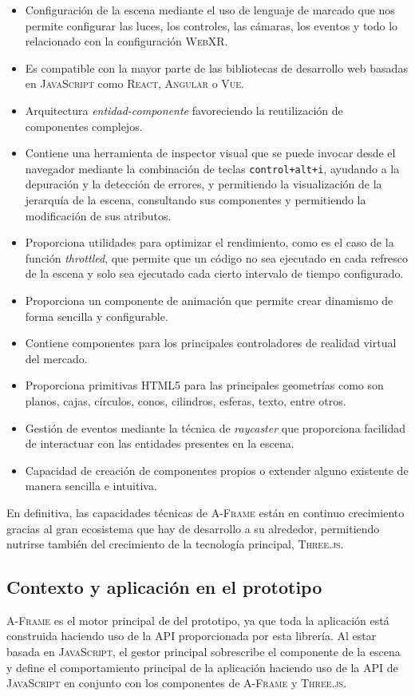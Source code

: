 \documentclass[a4paper, 11pt]{book}
\begin{document}
\begin{itemize}
	\item Configuración de la escena mediante el uso de lenguaje de marcado que nos permite configurar las luces, los controles, las cámaras, los eventos y todo lo relacionado con la configuración \textsc{WebXR}.
	\item Es compatible con la mayor parte de las bibliotecas de desarrollo web basadas en \textsc{JavaScript} como \textsc{React}, \textsc{Angular} o \textsc{Vue}.
	\item Arquitectura \emph{entidad-componente} favoreciendo la reutilización de componentes complejos.
	\item Contiene una herramienta de inspector visual que se puede invocar desde el navegador mediante la combinación de teclas \texttt{control+alt+i}, ayudando a la depuración y la detección de errores, y permitiendo la visualización de la jerarquía de la escena, consultando sus componentes y permitiendo la modificación de sus atributos.
	\item Proporciona utilidades para optimizar el rendimiento, como es el caso de la función \emph{throttled}, que permite que un código no sea ejecutado en cada refresco de la escena y solo sea ejecutado cada cierto intervalo de tiempo configurado.
	\item Proporciona un componente de animación que permite crear dinamismo de forma sencilla y configurable.
	\item Contiene componentes para los principales controladores de realidad virtual del mercado.
	\item Proporciona primitivas \textsc{HTML5} para las principales geometrías como son planos, cajas, círculos, conos, cilindros, esferas, texto, entre otros.
	\item Gestión de eventos mediante la técnica de \emph{\gls{raycaster}} que proporciona facilidad de interactuar con las entidades presentes en la escena.
	\item Capacidad de creación de componentes propios o extender alguno existente de manera sencilla e intuitiva.
\end{itemize}

En definitiva, las capacidades técnicas de \textsc{A-Frame} están en continuo crecimiento gracias al gran ecosistema que hay de desarrollo a su alrededor, permitiendo nutrirse también del crecimiento de la tecnología principal, \textsc{Three.js}.
\subsection{Contexto y aplicación en el prototipo}
\textsc{A-Frame} es el motor principal de  del prototipo, ya que toda la aplicación está construida haciendo uso de la \textsc{\gls{API}} proporcionada por esta librería. Al estar basada en \textsc{JavaScript}, el gestor principal sobrescribe el componente de la escena y define el comportamiento principal de la aplicación haciendo uso de la \textsc{API} de \textsc{JavaScript} en conjunto con los componentes de \textsc{A-Frame} y \textsc{Three.js}.
\end{document}
